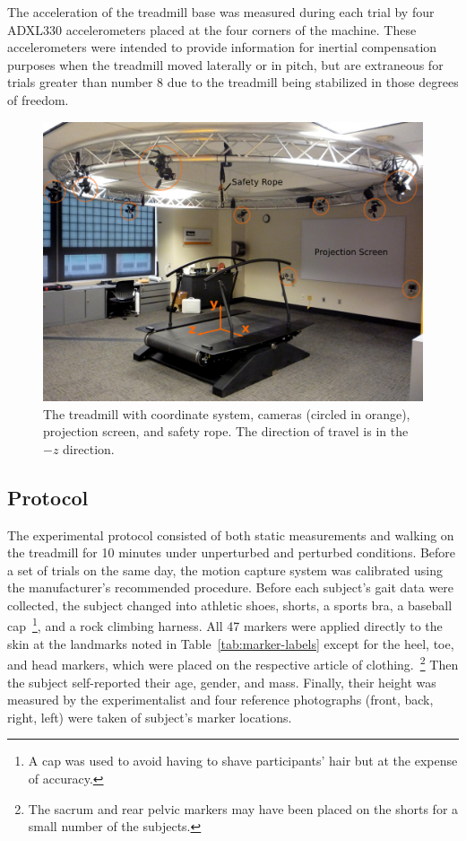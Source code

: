 \documentclass[fleqn,12pt]{wlpeerj}
\begin{document}
The acceleration of the treadmill base was measured during each trial by four
ADXL330 accelerometers placed at the four corners of the machine. These
accelerometers were intended to provide information for inertial compensation
purposes when the treadmill moved laterally or in pitch, but are extraneous for
trials greater than number 8 due to the treadmill being stabilized in those
degrees of freedom.
%
\begin{figure}
  \centering
  \includegraphics{figures/treadmill.png}
  \caption{The treadmill with coordinate system, cameras (circled in orange),
    projection screen, and safety rope. The direction of travel is in the $-z$
    direction.}
  \label{fig:treadmill}
\end{figure}

\subsection*{Protocol}
%
The experimental protocol consisted of both static measurements and walking on
the treadmill for 10 minutes under unperturbed and perturbed conditions. Before
a set of trials on the same day, the motion capture system was calibrated using
the manufacturer's recommended procedure. Before each subject's gait data were
collected, the subject changed into athletic shoes, shorts, a sports bra,
a baseball cap~\footnote{A cap was used to avoid having to shave participants'
hair but at the expense of accuracy.}, and a rock climbing harness. All 47 markers
were applied directly to the skin at the landmarks noted in
Table~\ref{tab:marker-labels} except for the heel, toe, and head markers, which
were placed on the respective article of clothing.~\footnote{The sacrum and
rear pelvic markers may have been placed on the shorts for a small number of
the subjects.} Then the subject self-reported their age, gender, and mass.
Finally, their height was measured by the experimentalist and four reference
photographs (front, back, right, left) were taken of subject's marker
locations.
\end{document}
